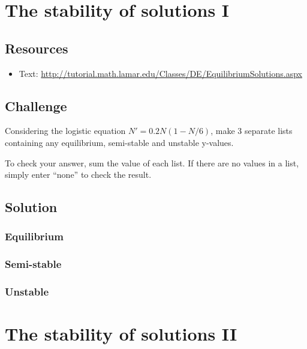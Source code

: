 \newpage
\section{The stability of solutions I}

\subsection*{Resources}
\begin{itemize}
    \item Text: \url{http://tutorial.math.lamar.edu/Classes/DE/EquilibriumSolutions.aspx}
\end{itemize}

\subsection*{Challenge}
Considering the logistic equation $N'=0.2N(1-N/6)$, make 3 separate lists containing any equilibrium, semi-stable and unstable y-values.

To check your answer, sum the value of each list. If there are no values in a list, simply enter ``none'' to check the result.

\subsection*{Solution}
\subsubsection*{Equilibrium}
\six{}


\subsubsection*{Semi-stable}
\six{}


\subsubsection*{Unstable}
\six{}


\timebox



\newpage
\section{The stability of solutions II}

